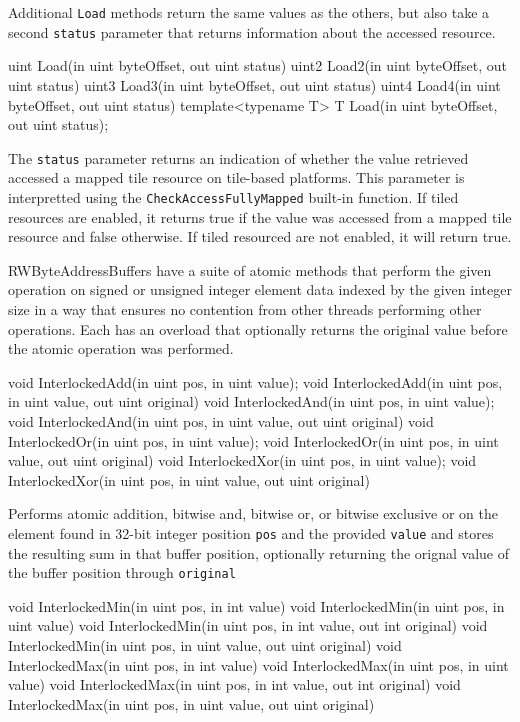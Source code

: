 Additional \texttt{Load} methods return the same values as the others,
but also take a second \texttt{status} parameter that returns information about the accessed resource.
\begin{HLSL}
  uint Load(in uint byteOffset, out uint status)
  uint2 Load2(in uint byteOffset, out uint status)
  uint3 Load3(in uint byteOffset, out uint status)
  uint4 Load4(in uint byteOffset, out uint status)
  template<typename T>
  T Load(in uint byteOffset, out uint status);
\end{HLSL}

The \texttt{status} parameter returns an indication of whether the value retrieved accessed a mapped tile
resource on tile-based platforms. This parameter is interpretted using the \texttt{CheckAccessFullyMapped}
built-in function. If tiled resources are enabled, it returns true if the value was accessed from a mapped
tile resource and false otherwise. If tiled resourced are not enabled, it will return true.



RWByteAddressBuffers have a suite of atomic methods that perform the given operation
on signed or unsigned integer element data indexed by the given integer size
in a way that ensures no contention from other threads performing other operations.
Each has an overload that optionally returns the original value before the atomic operation was performed.

\begin{HLSL}
   void InterlockedAdd(in uint pos, in uint value);
   void InterlockedAdd(in uint pos, in uint value, out uint original)
   void InterlockedAnd(in uint pos, in uint value);
   void InterlockedAnd(in uint pos, in uint value, out uint original)
   void InterlockedOr(in uint pos, in uint value);
   void InterlockedOr(in uint pos, in uint value, out uint original)
   void InterlockedXor(in uint pos, in uint value);
   void InterlockedXor(in uint pos, in uint value, out uint original)
\end{HLSL}

Performs atomic addition, bitwise and, bitwise or, or bitwise exclusive or
on the element found in 32-bit integer position \texttt{pos} and the provided \texttt{value}
and stores the resulting sum in that buffer position,
optionally returning the orignal value of the buffer position through \texttt{original}

\begin{HLSL}
   void InterlockedMin(in uint pos, in int value)
   void InterlockedMin(in uint pos, in uint value)
   void InterlockedMin(in uint pos, in int value, out int original)
   void InterlockedMin(in uint pos, in uint value, out uint original)
   void InterlockedMax(in uint pos, in int value)
   void InterlockedMax(in uint pos, in uint value)
   void InterlockedMax(in uint pos, in int value, out int original)
   void InterlockedMax(in uint pos, in uint value, out uint original)
\end{HLSL}

